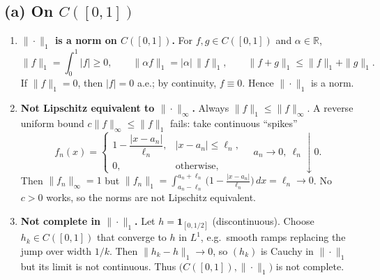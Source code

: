 \documentclass[12pt,a4paper]{article}
\theoremstyle{plain}
\theoremstyle{definition}
\theoremstyle{remark}
\theoremstyle{remark}
\begin{document}
\subsection*{(a) On $C([0,1])$}
\begin{enumerate}[1)]
	\item \textbf{$\|\cdot\|_{1}$ is a norm on $C([0,1])$.} For $f,g\in C([0,1])$ and $\alpha\in\mathbb{R}$,
	\[
	\|f\|_{1}=\int_{0}^{1}|f|\ge 0,\qquad
	\|\alpha f\|_{1}=|\alpha|\,\|f\|_{1},\qquad
	\|f+g\|_{1}\le \|f\|_{1}+\|g\|_{1}.
	\]
	If $\|f\|_{1}=0$, then $|f|=0$ a.e.; by continuity, $f\equiv 0$. Hence $\|\cdot\|_{1}$ is a norm.
	
	\item \textbf{Not Lipschitz equivalent to $\|\cdot\|_{\infty}$.}
	Always $\|f\|_{1}\le \|f\|_{\infty}$. A reverse uniform bound
	$c\|f\|_{\infty}\le \|f\|_{1}$ fails: take continuous “spikes”
	\[
	f_n(x)=\begin{cases}
		1-\dfrac{|x-a_n|}{\ell_n}, & |x-a_n|\le \ell_n,\\[4pt]
		0, & \text{otherwise},
	\end{cases}
	\quad a_n\to 0,\ \ell_n\downarrow 0.
	\]
	Then $\|f_n\|_{\infty}=1$ but $\|f_n\|_{1}=\int_{a_n-\ell_n}^{a_n+\ell_n}\!\!\big(1-\frac{|x-a_n|}{\ell_n}\big)\,dx
	=\ell_n\to 0$. No $c>0$ works, so the norms are not Lipschitz equivalent.
	
	\item \textbf{Not complete in $\|\cdot\|_{1}$.}
	Let $h=\mathbf{1}_{[0,1/2]}$ (discontinuous). Choose $h_k\in C([0,1])$ that converge to $h$ in $L^{1}$,
	e.g.\ smooth ramps replacing the jump over width $1/k$. Then $\|h_k-h\|_{1}\to 0$, so $(h_k)$ is Cauchy in
	$\|\cdot\|_{1}$ but its limit is not continuous. Thus $\big(C([0,1]),\|\cdot\|_{1}\big)$ is not complete.
\end{enumerate}
\end{document}
